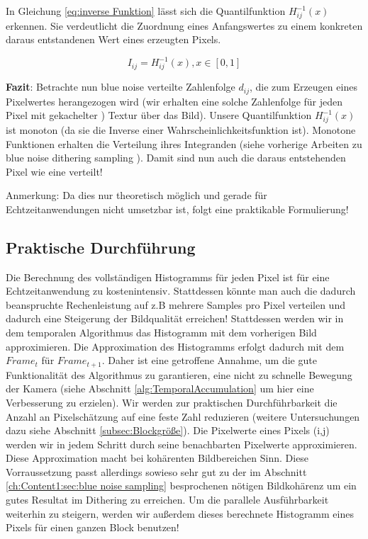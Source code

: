 In Gleichung \ref{eq:inverse Funktion} lässt sich die Quantilfunktion $H_{ij}^{-1}(x)$ erkennen. 
Sie verdeutlicht die Zuordnung eines Anfangswertes zu einem konkreten daraus entstandenen Wert 
eines erzeugten Pixels.

\begin{tcolorbox}[rightrule=3mm, rounded corners=east]
    \begin{equation}\label{eq:inverse Funktion}
        I_{ij} = H_{ij}^{-1}(x), x \in [0,1]
    \end{equation}
\end{tcolorbox}

\par

\textbf{Fazit}: Betrachte nun blue noise verteilte Zahlenfolge $d_{ij}$, die zum Erzeugen eines Pixelwertes herangezogen wird (wir erhalten eine solche 
Zahlenfolge für jeden Pixel mit gekachelter ) Textur über das Bild). Unsere Quantilfunktion 
$H_{ij}^{-1}(x)$ ist monoton (da sie die Inverse einer Wahrscheinlichkeitsfunktion ist). Monotone Funktionen erhalten die Verteilung ihres
Integranden (siehe vorherige Arbeiten zu \glqq blue noise dithering sampling\grqq{} \cite[Seite 3]{hal02158423} \cite{georgiev2016blue}). 
Damit sind nun auch die daraus entstehenden Pixel wie eine  verteilt! 

Anmerkung: Da dies nur theoretisch möglich und gerade für Echtzeitanwendungen nicht umsetzbar ist, 
folgt eine praktikable Formulierung!

\label{subsec:Praktische_Durchführung}
\subsection{Praktische Durchführung}

Die Berechnung des vollständigen Histogramms für jeden Pixel ist für eine Echtzeitanwendung zu kostenintensiv. Stattdessen könnte man auch die dadurch beanspruchte 
Rechenleistung auf z.B mehrere Samples pro Pixel verteilen und dadurch eine Steigerung der Bildqualität erreichen!
Stattdessen werden wir in dem temporalen Algorithmus das Histogramm mit dem vorherigen Bild approximieren. 
Die Approximation des Histogramms erfolgt dadurch mit dem $Frame_{t}$ für $Frame_{t+1}$. Daher ist eine getroffene Annahme, um die gute Funktionalität des 
Algorithmus zu garantieren, eine nicht zu schnelle Bewegung der Kamera (siehe Abschnitt \ref{alg:TemporalAccumulation} um hier eine Verbesserung zu erzielen).
Wir werden zur praktischen Durchführbarkeit die Anzahl an Pixelschätzung auf eine feste Zahl reduzieren (weitere Untersuchungen dazu siehe Abschnitt \ref{subsec:Blockgröße}).
Die Pixelwerte eines Pixels (i,j) werden wir in jedem Schritt durch seine benachbarten Pixelwerte approximieren. Diese Approximation macht bei kohärenten 
Bildbereichen Sinn. Diese Vorraussetzung passt allerdings sowieso sehr gut zu der im Abschnitt \ref{ch:Content1:sec:blue noise sampling} besprochenen nötigen 
Bildkohärenz um ein gutes Resultat im Dithering zu erreichen. Um die parallele Ausführbarkeit weiterhin zu steigern, werden wir außerdem dieses 
berechnete Histogramm eines Pixels für einen ganzen Block benutzen!
\par

